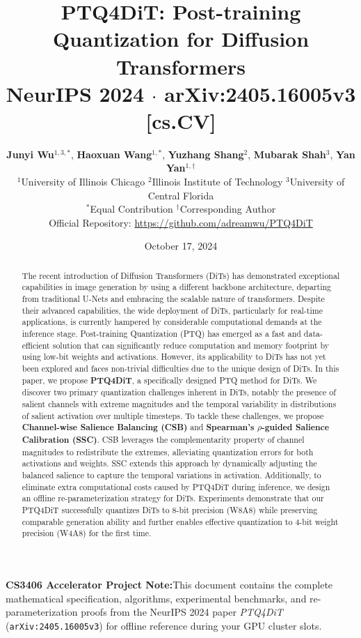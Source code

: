 \documentclass[10pt,a4paper]{article}
\title{\vspace{-10mm}\textbf{\LARGE\color{primary} PTQ4DiT: Post-training Quantization for Diffusion Transformers}\\[0.5em]
\large NeurIPS 2024 $\cdot$ arXiv:2405.16005v3 [cs.CV]}
\author{
\textbf{Junyi Wu}$^{1,3,*}$, \textbf{Haoxuan Wang}$^{1,*}$, \textbf{Yuzhang Shang}$^{2}$, \textbf{Mubarak Shah}$^{3}$, \textbf{Yan Yan}$^{1,\dagger}$\\[0.3em]
\small $^{1}$University of Illinois Chicago \quad $^{2}$Illinois Institute of Technology \quad $^{3}$University of Central Florida\\
\small $^{*}$Equal Contribution \quad $^{\dagger}$Corresponding Author\\
\small Official Repository: \url{https://github.com/adreamwu/PTQ4DiT}
}
\date{October 17, 2024}
\newcommand{\takeaway}[2]{%
  \vspace{6pt}\noindent\colorbox{primary!8}{%
    \parbox{\dimexpr\textwidth-2\fboxsep\relax}{%
      \vspace{3pt}\textbf{\color{primary}#1:}\hspace{0.5em}#2\vspace{3pt}%
    }%
  }\vspace{6pt}%
}
\begin{document}
\maketitle

\begin{abstract}
\noindent
The recent introduction of Diffusion Transformers (DiTs) has demonstrated exceptional capabilities in image generation by using a different backbone architecture, departing from traditional U-Nets and embracing the scalable nature of transformers. Despite their advanced capabilities, the wide deployment of DiTs, particularly for real-time applications, is currently hampered by considerable computational demands at the inference stage. Post-training Quantization (PTQ) has emerged as a fast and data-efficient solution that can significantly reduce computation and memory footprint by using low-bit weights and activations. However, its applicability to DiTs has not yet been explored and faces non-trivial difficulties due to the unique design of DiTs. In this paper, we propose \textbf{PTQ4DiT}, a specifically designed PTQ method for DiTs. We discover two primary quantization challenges inherent in DiTs, notably the presence of salient channels with extreme magnitudes and the temporal variability in distributions of salient activation over multiple timesteps. To tackle these challenges, we propose \textbf{Channel-wise Salience Balancing (CSB)} and \textbf{Spearman's $\rho$-guided Salience Calibration (SSC)}. CSB leverages the complementarity property of channel magnitudes to redistribute the extremes, alleviating quantization errors for both activations and weights. SSC extends this approach by dynamically adjusting the balanced salience to capture the temporal variations in activation. Additionally, to eliminate extra computational costs caused by PTQ4DiT during inference, we design an offline re-parameterization strategy for DiTs. Experiments demonstrate that our PTQ4DiT successfully quantizes DiTs to 8-bit precision (W8A8) while preserving comparable generation ability and further enables effective quantization to 4-bit weight precision (W4A8) for the first time.
\end{abstract}

\takeaway{CS3406 Accelerator Project Note}{This document contains the complete mathematical specification, algorithms, experimental benchmarks, and re-parameterization proofs from the NeurIPS 2024 paper \textit{PTQ4DiT} (\texttt{arXiv:2405.16005v3}) for offline reference during your GPU cluster slots.}
\end{document}

